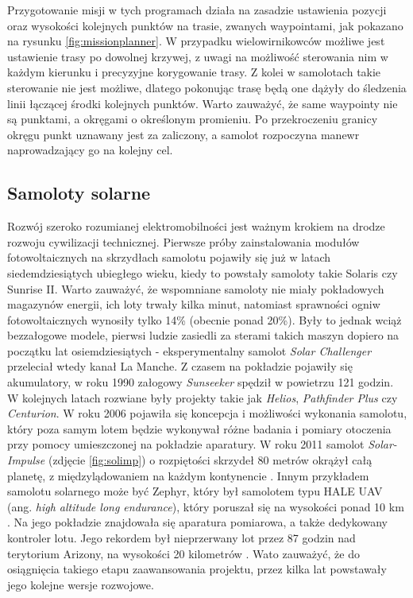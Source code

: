 \documentclass[12pt, a4paper]{article}
\begin{document}
Przygotowanie misji w tych programach działa na zasadzie ustawienia pozycji oraz wysokości kolejnych punktów na trasie, zwanych waypointami, jak pokazano na rysunku \ref{fig:missionplanner}. W przypadku wielowirnikowców możliwe jest ustawienie trasy po dowolnej krzywej, z uwagi na możliwość sterowania nim w każdym kierunku i precyzyjne korygowanie trasy. Z kolei w samolotach takie sterowanie nie jest możliwe, dlatego pokonując trasę będą one dążyły do śledzenia linii łączącej środki kolejnych punktów. Warto zauważyć, że same waypointy nie są punktami, a okręgami o określonym promieniu. Po przekroczeniu granicy okręgu punkt uznawany jest za zaliczony, a samolot rozpoczyna manewr naprowadzający go na kolejny cel.
\FloatBarrier

\subsection{Samoloty solarne}
Rozwój szeroko rozumianej elektromobilności jest ważnym krokiem na drodze rozwoju cywilizacji technicznej. Pierwsze próby zainstalowania modułów fotowoltaicznych na skrzydłach samolotu pojawiły się już w latach siedemdziesiątych ubiegłego wieku, kiedy to powstały samoloty takie Solaris czy Sunrise II. Warto zauważyć, że wspomniane samoloty nie miały pokładowych magazynów energii, ich loty trwały kilka minut, natomiast sprawności ogniw fotowoltaicznych wynosiły tylko 14\% (obecnie ponad 20\%). Były to jednak wciąż bezzałogowe modele, pierwsi ludzie zasiedli za sterami takich maszyn dopiero na początku lat osiemdziesiątych - eksperymentalny samolot \textit{Solar Challenger} przeleciał wtedy kanał La Manche. Z czasem na pokładzie pojawiły się akumulatory, w roku 1990 załogowy \textit{Sunseeker} spędził w powietrzu 121 godzin. W kolejnych latach rozwiane były projekty takie jak \textit{Helios}, \textit{Pathfinder Plus} czy \textit{Centurion}. W roku 2006 pojawiła się koncepcja i możliwości wykonania samolotu, który poza samym lotem będzie wykonywał różne badania i pomiary otoczenia przy pomocy umieszczonej na pokładzie aparatury. W roku 2011 samolot \textit{Solar-Impulse} (zdjęcie \ref{fig:solimp}) o rozpiętości skrzydeł 80 metrów okrążył całą planetę, z międzylądowaniem na każdym kontynencie \cite{Design of Solar Powered Airplane}. Innym przykładem samolotu solarnego może być Zephyr, który był samolotem typu HALE UAV (ang. \textit{high altitude long endurance}), który poruszał się na wysokości ponad 10 km . Na jego pokładzie znajdowała się aparatura pomiarowa, a także dedykowany kontroler lotu. Jego rekordem był nieprzerwany lot przez 87 godzin nad terytorium Arizony, na wysokości 20 kilometrów \cite{zephyr}. Wato zauważyć, że do osiągnięcia takiego etapu zaawansowania projektu, przez kilka lat powstawały jego kolejne wersje rozwojowe.
\end{document}
